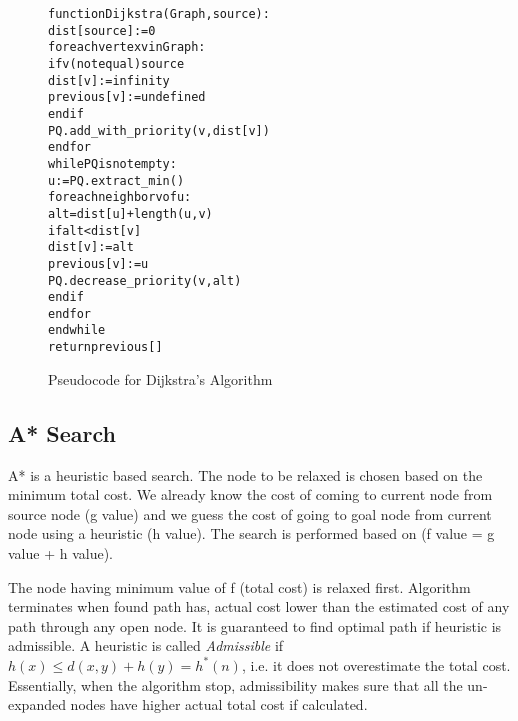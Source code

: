 \documentclass[a4paper,12pt]{article}
\begin{document}
\begin{figure}[h]
\begin{framed}
\begin{alltt}
\fontsize{8pt}{10pt}\selectfont
function Dijkstra(Graph, source):
    dist[source] := 0
    for each vertex v in Graph:
        if v (not equal) source
            dist[v] := infinity
            previous[v] := undefined
        end if
        PQ.add\_with\_priority(v,dist[v])
    end for
    while PQ is not empty:
        u := PQ.extract\_min()
        for each neighbor v of u:
            alt = dist[u] + length(u, v)
            if alt < dist[v]
                dist[v] := alt
                previous[v] := u
                PQ.decrease\_priority(v,alt)
            end if
        end for
    end while
    return previous[]
\end{alltt}
\end{framed}
\vspace*{-0.6cm}
\caption{Pseudocode for Dijkstra's Algorithm}
\vspace*{-0.4cm}
\end{figure}

\subsection{A* Search}
A* is a heuristic based search. The node to be relaxed is chosen based on the minimum total cost. We already know the cost of coming to current node from source node (g value) and we guess the cost of going to goal node from current node using a heuristic (h value). The search is performed based on (f value =  g value + h value).

The node having minimum value of f (total cost) is relaxed first. Algorithm terminates when found path has, actual cost lower than the estimated cost of any path through any open node. It is guaranteed to find optimal path if heuristic is admissible. A heuristic is called \textit{Admissible} if $h(x) \leq d(x,y) + h(y) = h^*(n)$, i.e. it does not overestimate the total cost. Essentially, when the algorithm stop, admissibility makes sure that all the un-expanded nodes have higher actual total cost if calculated.
\end{document}
